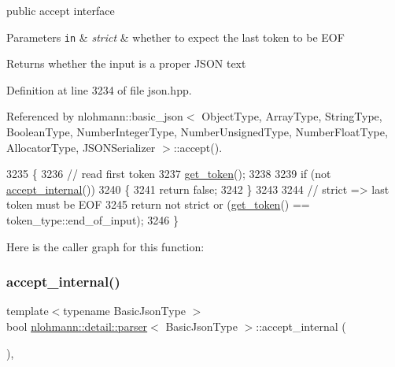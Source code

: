 public accept interface 


\begin{DoxyParams}[1]{Parameters}
\mbox{\tt in}  & {\em strict} & whether to expect the last token to be E\+OF \\
\hline
\end{DoxyParams}
\begin{DoxyReturn}{Returns}
whether the input is a proper J\+S\+ON text 
\end{DoxyReturn}


Definition at line 3234 of file json.\+hpp.



Referenced by nlohmann\+::basic\+\_\+json$<$ Object\+Type, Array\+Type, String\+Type, Boolean\+Type, Number\+Integer\+Type, Number\+Unsigned\+Type, Number\+Float\+Type, Allocator\+Type, J\+S\+O\+N\+Serializer $>$\+::accept().


\begin{DoxyCode}
3235     \{
3236         \textcolor{comment}{// read first token}
3237         \hyperlink{classnlohmann_1_1detail_1_1parser_a33f3859d0dd402445b5859070fd24bab}{get\_token}();
3238 
3239         \textcolor{keywordflow}{if} (not \hyperlink{classnlohmann_1_1detail_1_1parser_ae74703484283dbb328277a6f8c559bf8}{accept\_internal}())
3240         \{
3241             \textcolor{keywordflow}{return} \textcolor{keyword}{false};
3242         \}
3243 
3244         \textcolor{comment}{// strict => last token must be EOF}
3245         \textcolor{keywordflow}{return} not strict or (\hyperlink{classnlohmann_1_1detail_1_1parser_a33f3859d0dd402445b5859070fd24bab}{get\_token}() == token\_type::end\_of\_input);
3246     \}
\end{DoxyCode}
Here is the caller graph for this function\+:
\mbox{\label{classnlohmann_1_1detail_1_1parser_ae74703484283dbb328277a6f8c559bf8}} 
\subsubsection{\texorpdfstring{accept\+\_\+internal()}{accept\_internal()}}
{\footnotesize\ttfamily template$<$typename Basic\+Json\+Type $>$ \\
bool \hyperlink{classnlohmann_1_1detail_1_1parser}{nlohmann\+::detail\+::parser}$<$ Basic\+Json\+Type $>$\+::accept\+\_\+internal (\begin{DoxyParamCaption}{ }\end{DoxyParamCaption})\hspace{0.3cm}{\ttfamily [inline]}, {\ttfamily [private]}}



